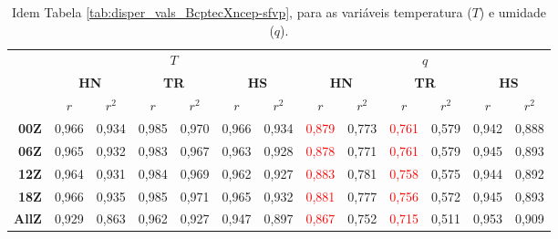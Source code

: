 \begin{table}[H]
\caption{Idem Tabela \ref{tab:disper_vals_BcptecXncep-sfvp}, para as variáveis temperatura ($T$) e umidade ($q$).}
\begin{center}
\begin{adjustbox}{max width=\textwidth}
\begin{tabular}{rcccccccccccc}
\toprule
\toprule
        & \multicolumn{6}{c}{$T$} & \multicolumn{6}{c}{$q$} \\
\cmidrule(lr{.75em}){2-7} \cmidrule(lr{.75em}){8-13}
        & \multicolumn{2}{c}{\textbf{HN}} & \multicolumn{2}{c}{\textbf{TR}} & \multicolumn{2}{c}{\textbf{HS}} & \multicolumn{2}{c}{\textbf{HN}} & \multicolumn{2}{c}{\textbf{TR}} & \multicolumn{2}{c}{\textbf{HS}} \\ 
\cmidrule(lr{.75em}){2-3} \cmidrule(lr{.75em}){4-5} \cmidrule(lr{.75em}){6-7} \cmidrule(lr{.75em}){8-9} \cmidrule(lr{.75em}){10-11} \cmidrule(lr{.75em}){12-13}
           & $r$ & $r^{2}$ & $r$ & $r^{2}$ & $r$ & $r^{2}$ & $r$ & $r^{2}$ & $r$ & $r^{2}$ & $r$ & $r^{2}$\\ 
\midrule 
\textbf{00Z}  & 0,966 & 0,934 & 0,985 & 0,970 & 0,966 & 0,934 & \textcolor{red}{0,879} & 0,773 & \textcolor{red}{0,761} & 0,579 & 0,942 & 0,888 \\
\textbf{06Z}  & 0,965 & 0,932 & 0,983 & 0,967 & 0,963 & 0,928 & \textcolor{red}{0,878} & 0,771 & \textcolor{red}{0,761} & 0,579 & 0,945 & 0,893 \\
\textbf{12Z}  & 0,964 & 0,931 & 0,984 & 0,969 & 0,962 & 0,927 & \textcolor{red}{0,883} & 0,781 & \textcolor{red}{0,758} & 0,575 & 0,944 & 0,892 \\
\textbf{18Z}  & 0,966 & 0,935 & 0,985 & 0,971 & 0,965 & 0,932 & \textcolor{red}{0,881} & 0,777 & \textcolor{red}{0,756} & 0,572 & 0,945 & 0,893 \\
\textbf{AllZ} & 0,929 & 0,863 & 0,962 & 0,927 & 0,947 & 0,897 & \textcolor{red}{0,867} & 0,752 & \textcolor{red}{0,715} & 0,511 & 0,953 & 0,909 \\
\bottomrule                                        
\end{tabular}
\end{adjustbox}
\end{center}
\label{tab:disper_vals_BcptecXncep-Tq}
\end{table}


